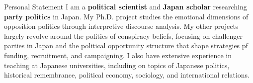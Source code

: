 \begin{rubric}{Personal Statement}
\entry*[]I am a \textbf{political scientist} and \textbf{Japan scholar} researching \textbf{party politics} in Japan. My Ph.D. project studies the emotional dimensions of opposition politics through interpretive discourse analysis. My other projects largely revolve around the politics of conspiracy beliefs, focusing on challenger parties in Japan and the political opportunity structure that shape strategies pf funding, recruitment, and campaigning. I also have extensive experience in teaching at Japanese universities, including on topics of Japanese politics, historical remembrance, political economy, sociology, and international relations.
\end{rubric}
